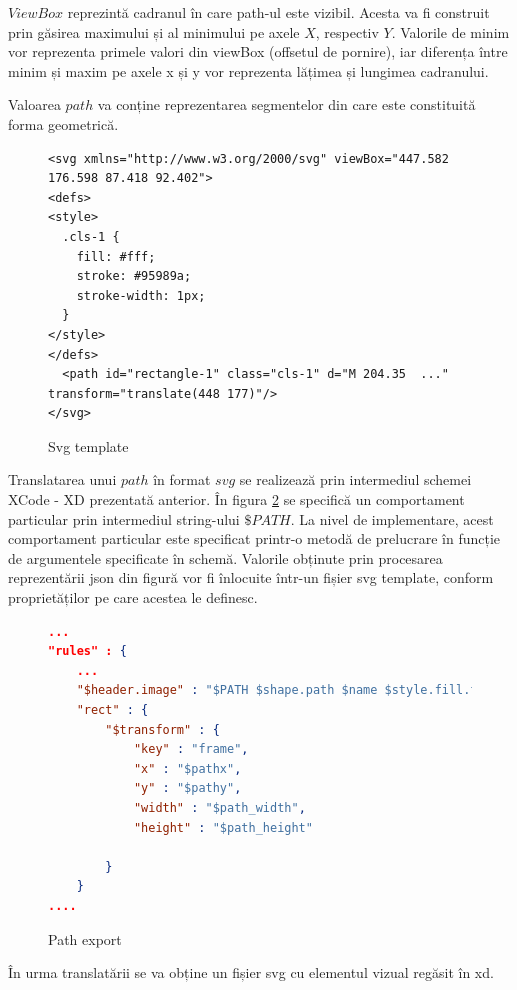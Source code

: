 $ViewBox$ reprezintă cadranul în care path-ul este vizibil. Acesta va fi construit prin găsirea maximului și al minimului pe axele $X$, respectiv $Y$. Valorile de minim vor reprezenta primele valori din viewBox (offsetul de pornire), iar diferența între minim și maxim pe axele x și y vor reprezenta lățimea și lungimea cadranului.

Valoarea $path$ va conține reprezentarea segmentelor din care este constituită forma geometrică.

\begin{figure}[!htbp]
\lstset{language=XML}
\begin{lstlisting}
<svg xmlns="http://www.w3.org/2000/svg" viewBox="447.582 176.598 87.418 92.402">
<defs>
<style>
  .cls-1 {
    fill: #fff;
    stroke: #95989a;
    stroke-width: 1px;
  }
</style>
</defs>
  <path id="rectangle-1" class="cls-1" d="M 204.35  ..." transform="translate(448 177)"/>
</svg>
\end{lstlisting}
\caption{Svg template}\label{fig:svg}
\end{figure}

Translatarea unui $path$ în format $svg$ se realizează prin intermediul schemei XCode - XD prezentată anterior. În figura \ref{fig:PathExport} se specifică un comportament particular prin intermediul string-ului $\$PATH$. La nivel de implementare, acest comportament particular este specificat printr-o metodă de prelucrare în funcție de argumentele specificate în schemă. Valorile obținute prin procesarea reprezentării json din figură vor fi înlocuite într-un fișier svg template, conform proprietăților pe care acestea le definesc. 

\begin{figure}[!htbp]
\begin{lstlisting}[language=json,firstnumber=1]
...
"rules" : {
    ...
    "$header.image" : "$PATH $shape.path $name $style.fill.type $style.fill.color.value $transform $style.stroke.color.value $style.stroke.width",
    "rect" : {
        "$transform" : {
            "key" : "frame",
            "x" : "$pathx",
            "y" : "$pathy",
            "width" : "$path_width",
            "height" : "$path_height"
                        
        }
    }
....
\end{lstlisting}
\caption{Path export} \label{fig:PathExport}
\end{figure}


În urma translatării se va obține un fișier svg cu elementul vizual regăsit în xd. 

